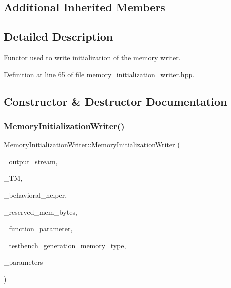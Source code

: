 \subsection*{Additional Inherited Members}


\subsection{Detailed Description}
Functor used to write initialization of the memory writer. 

Definition at line 65 of file memory\+\_\+initialization\+\_\+writer.\+hpp.



\subsection{Constructor \& Destructor Documentation}
\mbox{\label{classMemoryInitializationWriter_ad0980c4a848a1427036007ca9b299f21}} 
\subsubsection{\texorpdfstring{Memory\+Initialization\+Writer()}{MemoryInitializationWriter()}}
{\footnotesize\ttfamily Memory\+Initialization\+Writer\+::\+Memory\+Initialization\+Writer (\begin{DoxyParamCaption}\item[{std\+::ofstream \&}]{\+\_\+output\+\_\+stream,  }\item[{const \hyperlink{tree__manager_8hpp_a792e3f1f892d7d997a8d8a4a12e39346}{tree\+\_\+manager\+Const\+Ref}}]{\+\_\+\+TM,  }\item[{const \hyperlink{behavioral__helper_8hpp_aae973b54cac87eef3b27442aa3e1e425}{Behavioral\+Helper\+Const\+Ref}}]{\+\_\+behavioral\+\_\+helper,  }\item[{const unsigned long int}]{\+\_\+reserved\+\_\+mem\+\_\+bytes,  }\item[{const \hyperlink{tree__node_8hpp_a3cf5d02292c940f3892425a5b5fdec3c}{tree\+\_\+node\+Const\+Ref}}]{\+\_\+function\+\_\+parameter,  }\item[{const \hyperlink{testbench__generation_8hpp_ad84688161fffbe7da2fc2b9a39b93198}{Testbench\+Generation\+\_\+\+Memory\+Type}}]{\+\_\+testbench\+\_\+generation\+\_\+memory\+\_\+type,  }\item[{const \hyperlink{Parameter_8hpp_a37841774a6fcb479b597fdf8955eb4ea}{Parameter\+Const\+Ref}}]{\+\_\+parameters }\end{DoxyParamCaption})}



